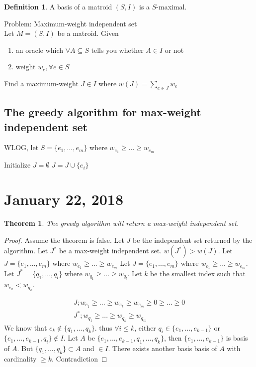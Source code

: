 \documentclass{article}
\theoremstyle{plain}
\newtheorem{thm}{Theorem}
\theoremstyle{definition}
\newtheorem{defn}{Definition}
\begin{document}
\begin{defn}
    A basis of a matroid $(S, I)$ is a $S$-maximal.
\end{defn}

Problem: Maximum-weight independent set\\
Let $M = (S, I)$ be a matroid. Given
\begin{enumerate}
    \item an oracle which $\forall A\subseteq S$ tells you whether $A\in I$ or not
    \item weight $w_e, \forall e\in S$
\end{enumerate}
Find a maximum-weight $J\in I$ where $w(J) = \sum_{e\in J} w_e$

\subsection{The greedy algorithm for max-weight independent set}
WLOG, let $S = \{e_1, ...,  e_m\}$ where $w_{e_1} \geq ... \geq w_{e_m}$

\begin{algorithmic}[1]
    \State Initialize $J = \emptyset$
            \State $J = J\cup \{e_i\}$
        \EndIf
    \EndFor
\end{algorithmic}


\section{January 22, 2018}
\begin{thm}
    The greedy algorithm will return a max-weight independent set.
\end{thm}

\begin{proof}
    Assume the theorem is false. Let $J$ be the independent set returned by the
    algorithm. Let $J^*$ be a max-weight independent set.
    $w(J^*) > w(J)$. Let $J= \{e_1, ..., e_m\}$ where $w_{e_1} \geq ...\geq w_{e_m}$
    Let $J = \{e_1, ..., e_m\}$ where $w_{e_1} \geq ...\geq w_{e_m}$. Let
    $J^* = \{q_1, ..., q_l\}$ where $w_{q_1} \geq ... \geq w_{q_l}$. Let
    $k$ be the smallest index such that $w_{e_k} < w_{q_k}$.

    \begin{align*}
        J; w_{e_1} \geq ... \geq w_{e_k} \geq w_{e_m} \geq 0 \geq ... \geq 0\\
        J^*; w_{q_1} \geq ... \geq w_{q_k} \geq w_{q_m}
    \end{align*}
    We know that $e_k \not\in \{q_1, ..., q_k\}$.
    thus $\forall i\leq k$, either
    $q_i \in \{e_1, ..., e_{k-1}\}$ or $\{e_1, ..., e_{k-1}, q_i\}\not\in I$.
    Let $A$ be $\{e_1,..., e_{k-1}, q_1, ..., q_k\}$, then $\{e_1, ..., e_{k-1}\}$
    is basis of $A$. But $\{q_1, ..., q_k\}\subset A$ and $\in I$. There exists
    another basis basis of $A$ with cardinality $\geq k$. Contradiction
\end{proof}
\end{document}
